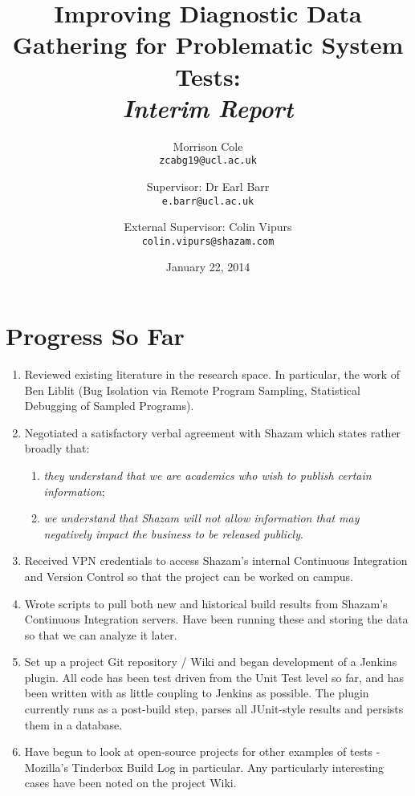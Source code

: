 
\setcounter{oldSectionCounter}{\value{section}}
\setcounter{oldPageCounter}{\value{page}}

\setcounter{section}{0}

\title{
	Improving Diagnostic Data Gathering for Problematic System Tests:\\
	\itshape{Interim Report}
}
\author{
	Morrison Cole\\
	\texttt{zcabg19@ucl.ac.uk}
	\and
	Supervisor: Dr Earl Barr\\
	\texttt{e.barr@ucl.ac.uk}
	\and
	External Supervisor: Colin Vipurs\\
	\texttt{colin.vipurs@shazam.com}
}
\date{January 22, 2014}

\maketitle

\section{Progress So Far}

\begin{enumerate}
	\item{
		Reviewed existing literature in the research space. In particular, the work of Ben Liblit (Bug Isolation via Remote Program Sampling, Statistical Debugging of Sampled Programs).
	}
	\item{
		Negotiated a satisfactory verbal agreement with Shazam which states rather broadly that:
		\begin{enumerate}
		\item{\itshape they understand that we are academics who wish to publish certain information};
		\item {\itshape we understand that Shazam will not allow information that may negatively impact the business to be released publicly}.
		\end{enumerate}
	}
	\item{
		Received VPN credentials to access Shazam's internal Continuous Integration and Version Control so that the project can be worked on campus.
	}
	\item{
		Wrote scripts to pull both new and historical build results from Shazam's Continuous Integration servers. Have been running these and storing the data so that we can analyze it later.
	}
	\item{
		Set up a project Git repository / Wiki and began development of a Jenkins plugin. All code has been test driven from the Unit Test level so far, and has been written with as little coupling to Jenkins as possible. The plugin currently runs as a post-build step, parses all JUnit-style results and persists them in a database.
	}
	\item{
		Have begun to look at open-source projects for other examples of \flaky tests - Mozilla's Tinderbox Build Log in particular. Any particularly interesting cases have been noted on the project Wiki.
	}
\end{enumerate}

